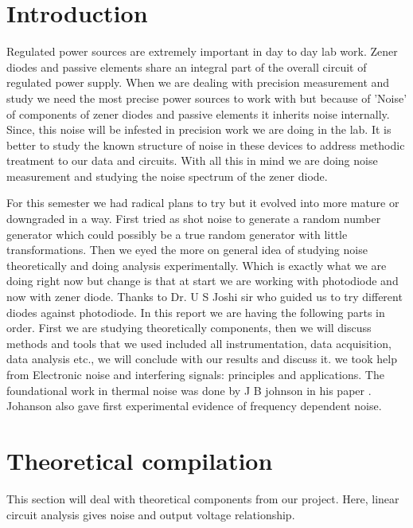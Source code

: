 \documentclass[draft,12pt]{article}
\begin{document}

\section{Introduction}\label{introduction}
\vspace{20pt}
Regulated power sources are extremely important in day to day lab work. Zener diodes and passive elements share an integral part of the overall circuit of regulated power supply.  When we are dealing with precision measurement and study we need the most precise power sources to work with but because of 'Noise' of components of zener diodes and passive elements it inherits noise internally. Since, this noise will be infested in precision work we are doing in the lab. It is better to study the known structure of noise in these devices to address methodic treatment to our data and circuits. With all this in mind we are doing noise measurement and studying the noise spectrum of the zener diode.

For this semester we had radical plans to try but it evolved into more mature or downgraded in a way. First tried as shot noise to generate a random number generator which could possibly be a true random generator with little transformations. Then we eyed the more on general idea of studying noise theoretically and doing analysis experimentally. Which is exactly what we are doing right now but change is that at start we are working with photodiode and now with zener diode. Thanks to Dr. U S Joshi sir who guided us to try different diodes against photodiode. In this report we are having the following parts in order. First we are studying theoretically components, then we will discuss methods and tools that we used included all instrumentation, data acquisition, data analysis etc., we will conclude with our results and discuss it. we took help from Electronic noise and interfering signals: principles and applications.\cite{vasilescu2005electronic} The foundational work in thermal noise was done by J B johnson in his paper . Johanson also gave first experimental evidence of frequency dependent noise.\cite{johnson1925schottky}



\newpage
\section{Theoretical compilation}\label{Theory}

This section will deal with theoretical components from our project. Here, linear circuit analysis gives noise and output voltage relationship. 
\end{document}
